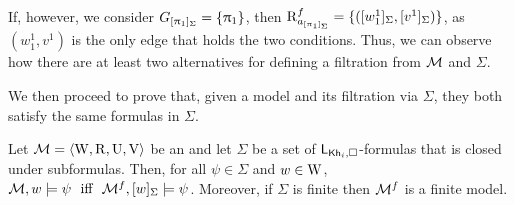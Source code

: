 \begin{example}
\begin{center}
\end{center}

If, however, we consider $G_{[\uppi_1]_\Sigma} = \{ \uppi_1 \}$, then $\operatorname{R}^f_{a_{[\uppi_1]_\Sigma}} = \{ ([w^1_1]_\Sigma,[v^1]_\Sigma) \}$, as $(w^1_1,v^1)$ is the only edge that holds the two conditions. Thus, we can observe how there are at least two alternatives for defining a filtration from $\mathcal{M}$ and $\Sigma$.
\end{example}

\medskip

We then proceed to prove that, given a model and its filtration via $\Sigma$, they both satisfy the same formulas in $\Sigma$.

\medskip

\begin{theorem}\label{th:filtration}
Let $\mathcal{M} = \langle \operatorname{W},\operatorname{R},\operatorname{U},\operatorname{V} \rangle$ be an \ults and
let $\Sigma$ be a set of $\mathsf{L}_{{\sf Kh}_i,\square}$-formulas that is closed under subformulas.
Then, for all $\psi \in \Sigma$ and $w \in \operatorname{W}$, 
    $\modults,w\models \psi \ \mbox{  iff  } \ \modults^f,[w]_\Sigma\models \psi$.
Moreover, if $\Sigma$ is finite then $\mathcal{M}^f$ is a finite model.
\end{theorem}

